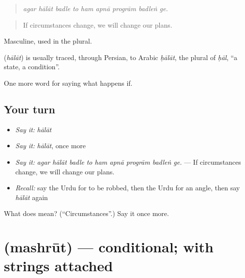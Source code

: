 \begin{quote}
        
\end{quote}

\begin{quote}
\emph{agar hālāt badle to ham apnā progrām badleṅ ge.}
\end{quote}

\begin{quote}
If circumstances change, we will change our plans.
\end{quote}

Masculine, used in the plural.

\begin{cousinweb}
\textbf{} (\emph{hālāt}) is usually traced, through Persian, to Arabic \emph{ḥālāt}, the plural of \emph{ḥāl}, \textquotedblleft{}a state, a condition\textquotedblright{}.
\end{cousinweb}

\begin{grammarlens}[title={What you've built}]
One more word for saying what happens if.
\end{grammarlens}

\subsection*{Your turn}
\begin{itemize}
\raggedright
  \item \emph{Say it:} \emph{hālāt}
  \item \emph{Say it:} \emph{hālāt}, once more
  \item \emph{Say it:} \emph{agar hālāt badle to ham apnā progrām badleṅ ge.} — If circumstances change, we will change our plans.
  \item \emph{Recall:} say the Urdu for to be robbed, then the Urdu for an angle, then say \emph{hālāt} again
\end{itemize}

\begin{tcolorbox}[breakable,colback=teal!4,colframe=teal!35!black,title={Before you move on}]
What does  mean? (\textquotedblleft{}Circumstances\textquotedblright{}.) Say it once more.
\end{tcolorbox}
\section[\texorpdfstring{\ur{مشروط} (mashrūt)}{مشروط (mashrūt)}]{ (mashrūt) — conditional; with strings attached}

